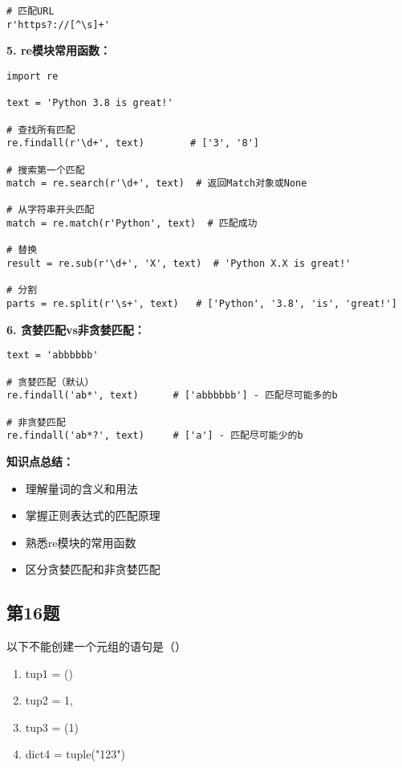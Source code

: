 \begin{mdframed}[linewidth=1pt, linecolor=black]
\begin{lstlisting}
# 匹配URL
r'https?://[^\s]+'
  \end{lstlisting}

  \textbf{5. re模块常用函数：}
  \begin{lstlisting}
import re

text = 'Python 3.8 is great!'

# 查找所有匹配
re.findall(r'\d+', text)        # ['3', '8']

# 搜索第一个匹配
match = re.search(r'\d+', text)  # 返回Match对象或None

# 从字符串开头匹配
match = re.match(r'Python', text)  # 匹配成功

# 替换
result = re.sub(r'\d+', 'X', text)  # 'Python X.X is great!'

# 分割
parts = re.split(r'\s+', text)   # ['Python', '3.8', 'is', 'great!']
  \end{lstlisting}

  \textbf{6. 贪婪匹配vs非贪婪匹配：}
  \begin{lstlisting}
text = 'abbbbbb'

# 贪婪匹配（默认）
re.findall('ab*', text)      # ['abbbbbb'] - 匹配尽可能多的b

# 非贪婪匹配
re.findall('ab*?', text)     # ['a'] - 匹配尽可能少的b
  \end{lstlisting}

  \textbf{知识点总结：}
  \begin{itemize}
    \item 理解量词的含义和用法
    \item 掌握正则表达式的匹配原理
    \item 熟悉re模块的常用函数
    \item 区分贪婪匹配和非贪婪匹配
  \end{itemize}

\end{mdframed}

\subsection{第16题}
以下不能创建一个元组的语句是（）

\begin{enumerate}[label=\Alph*.]
  \item tup1 = ()
  \item tup2 = 1,
  \item tup3 = (1)
  \item dict4 = tuple("123")
\end{enumerate}


